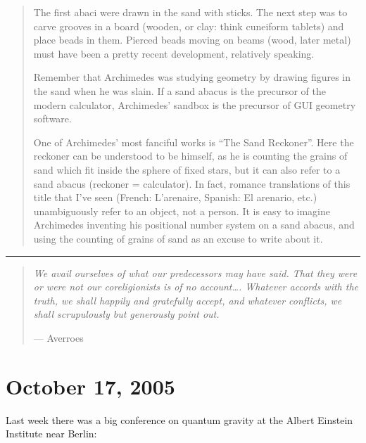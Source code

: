 \documentclass{article}
\def\tightlist{}
\renewcommand{\texttt}[1]{%
  \begingroup
  \ttfamily
  \begingroup\lccode`~=`/\lowercase{\endgroup\def~}{/\discretionary{}{}{}}%
  \begingroup\lccode`~=`[\lowercase{\endgroup\def~}{[\discretionary{}{}{}}%
  \begingroup\lccode`~=`.\lowercase{\endgroup\def~}{.\discretionary{}{}{}}%
  \catcode`/=\active\catcode`[=\active\catcode`.=\active
  \scantokens{#1\noexpand}%
  \endgroup
}
\begin{document}
\begin{quote}
The first abaci were drawn in the sand with sticks. The next step was to
carve grooves in a board (wooden, or clay: think cuneiform tablets) and
place beads in them. Pierced beads moving on beams (wood, later metal)
must have been a pretty recent development, relatively speaking.

Remember that Archimedes was studying geometry by drawing figures in the
sand when he was slain. If a sand abacus is the precursor of the modern
calculator, Archimedes' sandbox is the precursor of GUI geometry
software.

One of Archimedes' most fanciful works is ``The Sand Reckoner''. Here
the reckoner can be understood to be himself, as he is counting the
grains of sand which fit inside the sphere of fixed stars, but it can
also refer to a sand abacus (reckoner = calculator). In fact, romance
translations of this title that I've seen (French: L'arenaire, Spanish:
El arenario, etc.) unambiguously refer to an object, not a person. It is
easy to imagine Archimedes inventing his positional number system on a
sand abacus, and using the counting of grains of sand as an excuse to
write about it.
\end{quote}

\begin{center}\rule{0.5\linewidth}{0.5pt}\end{center}

\begin{quote}
\emph{We avail ourselves of what our predecessors may have said. That
they were or were not our coreligionists is of no account\ldots.
Whatever accords with the truth, we shall happily and gratefully accept,
and whatever conflicts, we shall scrupulously but generously point out.}

--- Averroes
\end{quote}



\hypertarget{week222}{%
\section{October 17, 2005}\label{week222}}

Last week there was a big conference on quantum gravity at the Albert
Einstein Institute near Berlin:

\end{document}
